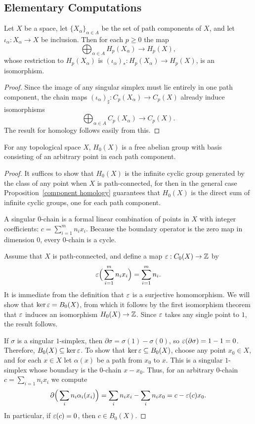 \subsection{Elementary Computations}
\begin{proposition}\label{component homology}
Let $X$ be a space, let $\{X_\alpha\}_{\alpha\in A}$ be the set of path components of $X$, and let $\iota_\alpha:X_\alpha\to X$ be inclusion. Then for each $p\geq0$ the map
\[\bigoplus_{\alpha\in A}H_p(X_\alpha)\to H_p(X),\]
whose restriction to $H_p(X_\alpha)$ is $(\iota_\alpha)_*:H_p(X_\alpha)\to H_p(X)$, is an isomorphism.
\end{proposition}
\begin{proof}
Since the image of any singular simplex must lie entirely in one path component, the chain maps $(\iota_\alpha)_\sharp:C_p(X_\alpha)\to C_p(X)$ already induce isomorphisms
\[\bigoplus_{\alpha\in A}C_p(X_\alpha)\to C_p(X).\]
The result for homology follows easily from this.
\end{proof}
\begin{proposition}\label{homology 0 dim}
For any topological space $X$, $H_0(X)$ is a free abelian group with basis consisting of an arbitrary point in each path component.
\end{proposition}
\begin{proof}
It suffices to show that $H_0(X)$ is the infinite cyclic group generated by the class of any point when $X$ is path-connected, for then in the general case Proposition~\ref{component homology} guarantees that $H_0(X)$ is the direct sum of infinite cyclic groups, one for each path component.\par
A singular $0$-chain is a formal linear combination of points in $X$ with integer coefficients: $c=\sum_{i=1}^{m}n_ix_i$. Because the boundary operator is the zero map in dimension $0$, every $0$-chain is a cycle.\par
Assume that $X$ is path-connected, and define a map $\varepsilon:C_0(X)\to\mathbb{Z}$ by
\[\varepsilon\Big(\sum_{i=1}^{m}n_ix_i\Big)=\sum_{i=1}^{m}n_i.\]
It is immediate from the definition that $\varepsilon$ is a surjective homomorphism. We will show that $\mathrm{ker}\,\varepsilon=B_0(X)$, from which it follows by the first isomorphism theorem that $\varepsilon$ induces an isomorphism $H_0(X)\to\mathbb{Z}$. Since $\varepsilon$ takes any single point to $1$, the result follows.\par
If $\sigma$ is a singular $1$-simplex, then $\partial\sigma=\sigma(1)-\sigma(0)$, so $\varepsilon(\partial\sigma)=1-1=0$. Therefore, $B_0(X)\subseteq\mathrm{ker}\,\varepsilon$. To show that $\mathrm{ker}\,\varepsilon\subseteq B_0(X)$, choose any point $x_0\in X$, and for each $x\in X$ let $\alpha(x)$ be a path from $x_0$ to $x$. This is a singular $1$-simplex whose boundary is the $0$-chain $x-x_0$. Thus, for an arbitrary $0$-chain $c=\sum_{i=1}n_ix_i$ we compute
\[\partial\Big(\sum_in_i\alpha_i(x_i)\Big)=\sum_in_ix_i-\sum_in_ix_0=c-\varepsilon(c)x_0.\]
In particular, if $\varepsilon(c)=0$, then $c\in B_0(X)$.
\end{proof}
